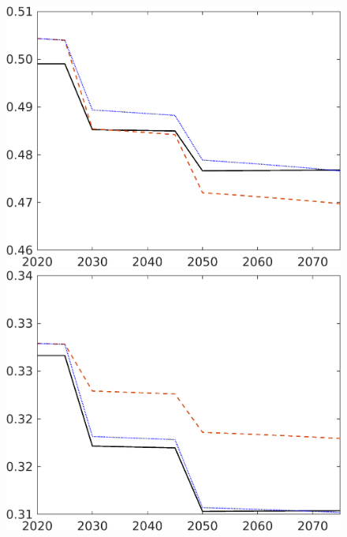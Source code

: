 \begin{figure}[h!!]
\begin{minipage}[]{0.32\textwidth}
		\includegraphics[width=1\textwidth]{../../codding_model/own_basedOnFried/optimalPol_190722_tidiedUp/figures/all_July22/hh_CompEffOPT_T_NoTaus_pol4_spillover0_noskill0_sep1_xgrowth0_etaa0.79_lgd0_lff0.png}
	\end{minipage}
	\begin{minipage}[]{0.32\textwidth}
		\includegraphics[width=1\textwidth]{../../codding_model/own_basedOnFried/optimalPol_190722_tidiedUp/figures/all_July22/hl_CompEffOPT_T_NoTaus_pol4_spillover0_noskill0_sep1_xgrowth0_etaa0.79_lgd0_lff0.png}
	\end{minipage}

\end{figure}
